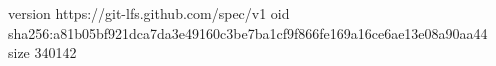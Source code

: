 version https://git-lfs.github.com/spec/v1
oid sha256:a81b05bf921dca7da3e49160c3be7ba1cf9f866fe169a16ce6ae13e08a90aa44
size 340142
